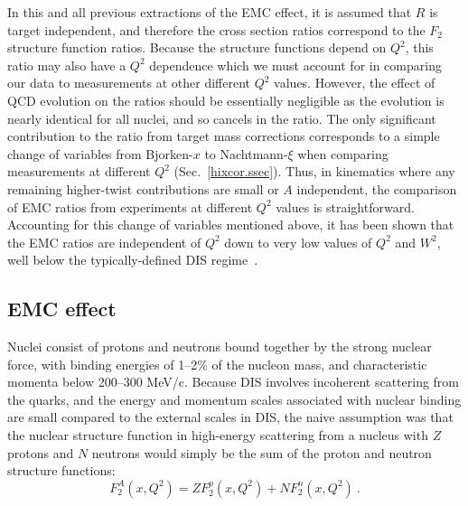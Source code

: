 In this and all previous extractions of the EMC effect, it is assumed that $R$
is target independent, and therefore the cross section ratios correspond to the
$F_2$ structure function ratios.  Because the structure functions depend
on $Q^2$, this ratio may also have a $Q^2$ dependence which we must account
for in comparing our data to measurements at other different $Q^2$ values.
However, the effect of QCD evolution on the ratios should be essentially
negligible as the evolution is nearly identical for all nuclei, and so cancels
in the ratio.  The only significant contribution to the ratio from target mass
corrections corresponds to a simple change of variables from Bjorken-$x$ to
Nachtmann-$\xi$ when comparing measurements at different $Q^2$
(Sec.~\ref{hixcor.ssec}).  Thus, in kinematics where any remaining higher-twist
contributions are small or $A$ independent, the comparison of EMC ratios from
experiments at different $Q^2$ values is straightforward. Accounting for this
change of variables mentioned above, it has been shown that the EMC ratios are
independent of $Q^2$ down to very low values of $Q^2$ and $W^2$, well below
the typically-defined DIS regime~\cite{Arrington:2003nt, niculescu06}.


\subsection{EMC effect}\label{emc.ssec}

Nuclei consist of protons and neutrons bound together by the strong nuclear
force, with binding energies of 1--2\% of the nucleon mass, and characteristic
momenta below 200--300 MeV/c. Because DIS involves incoherent scattering from
the quarks, and the energy and momentum scales associated with nuclear binding
are small compared to the external scales in DIS, the naive assumption was
that the nuclear structure function in high-energy scattering from a nucleus
with $Z$ protons and $N$ neutrons would simply be the sum of the proton and
neutron structure functions:
%
\begin{equation} \label{f2asimple1_eqn}
F^A_2(x,Q^2) = Z F^{p}_2(x,Q^2) + N F^{n}_2(x,Q^2) ~.
\end{equation}


